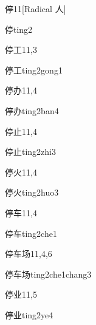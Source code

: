 \begin{entry}{停}{11}[Radical 人]
  \begin{phonetics}{停}{ting2}
  \end{phonetics}
\end{entry}

\begin{entry}{停工}{11,3}
  \begin{phonetics}{停工}{ting2gong1}
  \end{phonetics}
\end{entry}

\begin{entry}{停办}{11,4}
  \begin{phonetics}{停办}{ting2ban4}
  \end{phonetics}
\end{entry}

\begin{entry}{停止}{11,4}
  \begin{phonetics}{停止}{ting2zhi3}
  \end{phonetics}
\end{entry}

\begin{entry}{停火}{11,4}
  \begin{phonetics}{停火}{ting2huo3}
  \end{phonetics}
\end{entry}

\begin{entry}{停车}{11,4}
  \begin{phonetics}{停车}{ting2che1}
  \end{phonetics}
\end{entry}

\begin{entry}{停车场}{11,4,6}
  \begin{phonetics}{停车场}{ting2che1chang3}
  \end{phonetics}
\end{entry}

\begin{entry}{停业}{11,5}
  \begin{phonetics}{停业}{ting2ye4}
  \end{phonetics}
\end{entry}

